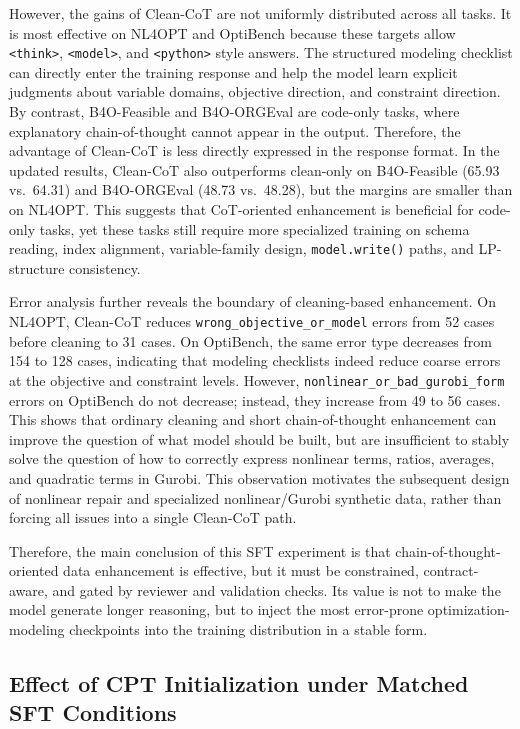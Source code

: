 However, the gains of Clean-CoT are not uniformly distributed across all tasks. It is most effective on NL4OPT and OptiBench because these targets allow \texttt{<think>}, \texttt{<model>}, and \texttt{<python>} style answers. The structured modeling checklist can directly enter the training response and help the model learn explicit judgments about variable domains, objective direction, and constraint direction. By contrast, B4O-Feasible and B4O-ORGEval are code-only tasks, where explanatory chain-of-thought cannot appear in the output. Therefore, the advantage of Clean-CoT is less directly expressed in the response format. In the updated results, Clean-CoT also outperforms clean-only on B4O-Feasible (65.93 vs.\ 64.31) and B4O-ORGEval (48.73 vs.\ 48.28), but the margins are smaller than on NL4OPT. This suggests that CoT-oriented enhancement is beneficial for code-only tasks, yet these tasks still require more specialized training on schema reading, index alignment, variable-family design, \texttt{model.write()} paths, and LP-structure consistency.


Error analysis further reveals the boundary of cleaning-based enhancement. On NL4OPT, Clean-CoT reduces \texttt{wrong\_objective\_or\_model} errors from 52 cases before cleaning to 31 cases. On OptiBench, the same error type decreases from 154 to 128 cases, indicating that modeling checklists indeed reduce coarse errors at the objective and constraint levels. However, \texttt{nonlinear\_or\_bad\_gurobi\_form} errors on OptiBench do not decrease; instead, they increase from 49 to 56 cases. This shows that ordinary cleaning and short chain-of-thought enhancement can improve the question of what model should be built, but are insufficient to stably solve the question of how to correctly express nonlinear terms, ratios, averages, and quadratic terms in Gurobi. This observation motivates the subsequent design of nonlinear repair and specialized nonlinear/Gurobi synthetic data, rather than forcing all issues into a single Clean-CoT path.

Therefore, the main conclusion of this SFT experiment is that chain-of-thought-oriented data enhancement is effective, but it must be constrained, contract-aware, and gated by reviewer and validation checks. Its value is not to make the model generate longer reasoning, but to inject the most error-prone optimization-modeling checkpoints into the training distribution in a stable form.

\subsection{Effect of CPT Initialization under Matched SFT Conditions}
\label{subsec:cpt_sft_transfer}

